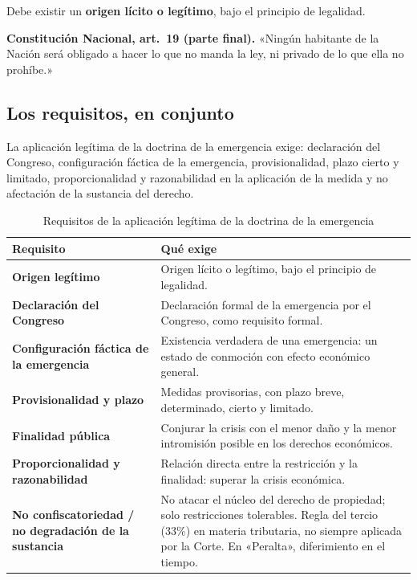 \documentclass[12pt,oneside]{book}
\begin{document}
Debe existir un \textbf{origen lícito o legítimo}, bajo el principio de legalidad.

\begin{note}
\textbf{Constitución Nacional, art.\ 19 (parte final).} «Ningún habitante de la Nación será obligado a hacer lo que no manda la ley, ni privado de lo que ella no prohíbe.»
\end{note}

\subsection{Los requisitos, en conjunto}

La aplicación legítima de la doctrina de la emergencia exige: declaración del Congreso, configuración fáctica de la emergencia, provisionalidad, plazo cierto y limitado, proporcionalidad y razonabilidad en la aplicación de la medida y no afectación de la sustancia del derecho.

\begin{table}[H]
\centering
\caption{Requisitos de la aplicación legítima de la doctrina de la emergencia}
\renewcommand{\arraystretch}{1.25}
\begin{tabularx}{\textwidth}{>{\raggedright\arraybackslash}p{} >{\raggedright\arraybackslash}X}
\toprule
\textbf{Requisito} & \textbf{Qué exige} \\
\midrule
\textbf{Origen legítimo} & Origen lícito o legítimo, bajo el principio de legalidad. \\
\textbf{Declaración del Congreso} & Declaración formal de la emergencia por el Congreso, como requisito formal. \\
\textbf{Configuración fáctica de la emergencia} & Existencia verdadera de una emergencia: un estado de conmoción con efecto económico general. \\
\textbf{Provisionalidad y plazo} & Medidas provisorias, con plazo breve, determinado, cierto y limitado. \\
\textbf{Finalidad pública} & Conjurar la crisis con el menor daño y la menor intromisión posible en los derechos económicos. \\
\textbf{Proporcionalidad y razonabilidad} & Relación directa entre la restricción y la finalidad: superar la crisis económica. \\
\textbf{No confiscatoriedad / no degradación de la sustancia} & No atacar el núcleo del derecho de propiedad; solo restricciones tolerables. Regla del tercio (33\%) en materia tributaria, no siempre aplicada por la Corte. En «Peralta», diferimiento en el tiempo. \\
\bottomrule
\end{tabularx}
\end{table}
\end{document}
